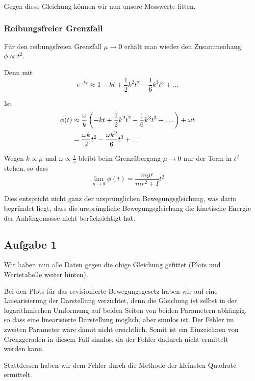 \documentclass[a4paper,german,12pt,smallheadings]{scrartcl}
\begin{document}
Gegen diese Gleichung können wir nun unsere Messwerte fitten.

\subsubsection{Reibungsfreier Grenzfall}
Für den reibungsfreien Grenzfall $\mu \to
0$ erhält man wieder den Zusammenhang $\phi \propto t^2$.

Denn mit
\begin{equation}
  e^{-kt} \approx 1 - kt + \frac{1}{2} k^2 t^2 - \frac{1}{6} k^3t^3 + \dots
\end{equation}

Ist
\begin{align}
  \phi(t) &\approx \frac{\omega}{k}\del{-kt + \frac{1}{2}k^2t^2 - \frac{1}{6} k^3t^3 + \dots} + \omega t\\
          &= \frac{\omega k}{2} t^2 -  \frac{\omega k^2}{6} t^3 + \dots
\end{align}

Wegen $k \propto \mu$ und $\omega \propto \frac{1}{\omega}$ bleibt beim Grenzübergang $\mu \to 0$ nur der Term in $t^2$ stehen, so dass
\begin{equation}
  \lim_{\mu \to 0} \phi(t) = \frac{mgr}{mr^2 +I} t^2
\end{equation}

Dies entspricht nicht ganz der ursprünglichen Bewegungsgleichung, was darin
begründet liegt, dass die ursprüngliche Bewegungsgleichung die kinetische
Energie der Anhängemasse nicht berücksichtigt hat.

\subsection{Aufgabe 1}
Wir haben nun alle Daten gegen die obige Gleichung gefittet (Plots und
Wertetabelle weiter hinten).

Bei den Plots für das revisionierte Bewegungsgesetz haben wir auf eine
Linearisierung der Darstellung verzichtet, denn die Gleichung ist selbst in der
logarithmischen Umformung auf beiden Seiten von beiden Parametern abhängig, so
dass eine linearisierte Darstellung möglich, aber sinnlos ist. Der Fehler im
zweiten Parameter wäre damit nicht ersichtlich. Somit ist ein Einzeichnen von
Grenzgeraden in diesem Fall sinnlos, da der Fehler dadurch nicht ermittelt
werden kann.

Stattdessen haben wir dem Fehler durch die Methode der kleinsten Quadrate
ermittelt.
\end{document}
